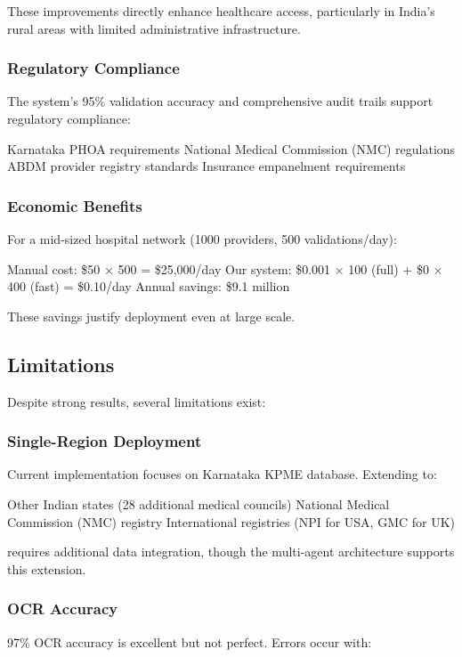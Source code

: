 \documentclass[conference]{IEEEtran}
\begin{document}
These improvements directly enhance healthcare access, particularly in India's rural areas with limited administrative infrastructure.

\subsubsection{Regulatory Compliance}

The system's 95\% validation accuracy and comprehensive audit trails support regulatory compliance:

Karnataka PHOA requirements
National Medical Commission (NMC) regulations
ABDM provider registry standards
Insurance empanelment requirements

\subsubsection{Economic Benefits}

For a mid-sized hospital network (1000 providers, 500 validations/day):

Manual cost: \$50 × 500 = \$25,000/day
Our system: \$0.001 × 100 (full) + \$0 × 400 (fast) = \$0.10/day
Annual savings: \$9.1 million

These savings justify deployment even at large scale.

\subsection{Limitations}

Despite strong results, several limitations exist:

\subsubsection{Single-Region Deployment}

Current implementation focuses on Karnataka KPME database. Extending to:

Other Indian states (28 additional medical councils)
National Medical Commission (NMC) registry
International registries (NPI for USA, GMC for UK)

requires additional data integration, though the multi-agent architecture supports this extension.

\subsubsection{OCR Accuracy}

97\% OCR accuracy is excellent but not perfect. Errors occur with:
\end{document}
